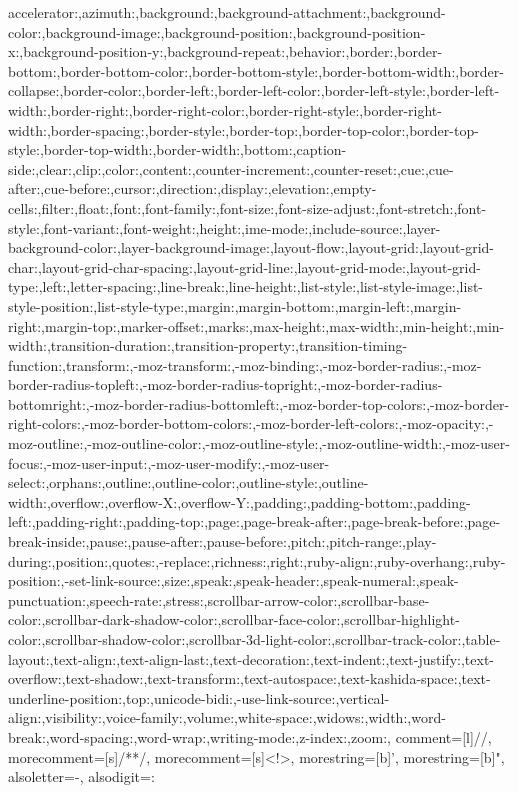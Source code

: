 {{accelerator:,azimuth:,background:,background-attachment:,background-color:,background-image:,background-position:,background-position-x:,background-position-y:,background-repeat:,behavior:,border:,border-bottom:,border-bottom-color:,border-bottom-style:,border-bottom-width:,border-collapse:,border-color:,border-left:,border-left-color:,border-left-style:,border-left-width:,border-right:,border-right-color:,border-right-style:,border-right-width:,border-spacing:,border-style:,border-top:,border-top-color:,border-top-style:,border-top-width:,border-width:,bottom:,caption-side:,clear:,clip:,color:,content:,counter-increment:,counter-reset:,cue:,cue-after:,cue-before:,cursor:,direction:,display:,elevation:,empty-cells:,filter:,float:,font:,font-family:,font-size:,font-size-adjust:,font-stretch:,font-style:,font-variant:,font-weight:,height:,ime-mode:,include-source:,layer-background-color:,layer-background-image:,layout-flow:,layout-grid:,layout-grid-char:,layout-grid-char-spacing:,layout-grid-line:,layout-grid-mode:,layout-grid-type:,left:,letter-spacing:,line-break:,line-height:,list-style:,list-style-image:,list-style-position:,list-style-type:,margin:,margin-bottom:,margin-left:,margin-right:,margin-top:,marker-offset:,marks:,max-height:,max-width:,min-height:,min-width:,transition-duration:,transition-property:,transition-timing-function:,transform:,-moz-transform:,-moz-binding:,-moz-border-radius:,-moz-border-radius-topleft:,-moz-border-radius-topright:,-moz-border-radius-bottomright:,-moz-border-radius-bottomleft:,-moz-border-top-colors:,-moz-border-right-colors:,-moz-border-bottom-colors:,-moz-border-left-colors:,-moz-opacity:,-moz-outline:,-moz-outline-color:,-moz-outline-style:,-moz-outline-width:,-moz-user-focus:,-moz-user-input:,-moz-user-modify:,-moz-user-select:,orphans:,outline:,outline-color:,outline-style:,outline-width:,overflow:,overflow-X:,overflow-Y:,padding:,padding-bottom:,padding-left:,padding-right:,padding-top:,page:,page-break-after:,page-break-before:,page-break-inside:,pause:,pause-after:,pause-before:,pitch:,pitch-range:,play-during:,position:,quotes:,-replace:,richness:,right:,ruby-align:,ruby-overhang:,ruby-position:,-set-link-source:,size:,speak:,speak-header:,speak-numeral:,speak-punctuation:,speech-rate:,stress:,scrollbar-arrow-color:,scrollbar-base-color:,scrollbar-dark-shadow-color:,scrollbar-face-color:,scrollbar-highlight-color:,scrollbar-shadow-color:,scrollbar-3d-light-color:,scrollbar-track-color:,table-layout:,text-align:,text-align-last:,text-decoration:,text-indent:,text-justify:,text-overflow:,text-shadow:,text-transform:,text-autospace:,text-kashida-space:,text-underline-position:,top:,unicode-bidi:,-use-link-source:,vertical-align:,visibility:,voice-family:,volume:,white-space:,widows:,width:,word-break:,word-spacing:,word-wrap:,writing-mode:,z-index:,zoom:},   
    comment=[l]{//},
    morecomment=[s]{/*}{*/},
    morecomment=[s]{<!}{>},
    morestring=[b]',
    morestring=[b]",    
    alsoletter={-},
    alsodigit={:}
}
